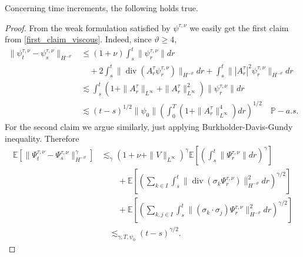 \documentclass[a4paper,10pt]{amsart}
\newcommand{\expt}[1]{\mathbb{E}\left[#1\right]}
\newtheorem{lemma}[theorem]{Lemma}
\theoremstyle{remark}
\numberwithin{equation}{section}
\begin{document}
Concerning time increments, the following holds true.
\begin{proof}
    From the weak formulation satisfied by $\psi^{\tau,\nu}$ we easily get the first claim from \eqref{first_claim_viscous}. Indeed, since $\vartheta\geq 4,$
    \begin{align*}
	        \|\psi^{\tau,\nu}_t-\psi^{\tau,\nu}_s\|_{H^{-\vartheta}}
	        &\leq (1+\nu) \int_s^t \|\psi^{\tau,\nu}_r\|dr\\
	        &\quad+2\int_s^t
	        \|\operatorname{div}(A^{\tau}_r\psi^{\tau,\nu}_r)\|_{H^{-\vartheta}}dr+\int_s^t
	        \||A^{\tau}_r|^2\psi^{\tau,\nu}_r\|_{H^{-\vartheta}}dr\\
	        &\lesssim \int_s^t
	        (1+\|A^{\tau}_r\|_{L^{\infty}}
	        +\|A^{\tau}_r\|_{L^{\infty}}^2)
	        \|\psi^{\tau,\nu}_r\|dr\\
	        &\lesssim (t-s)^{1/2}\|\psi_0\|
	        \left(\int_0^T(1+\|A^{\tau}_r\|_{L^{\infty}}^4)dr
	        \right)^{1/2}
	        \quad \mathbb{P}-a.s.
    \end{align*}
    For the second claim we argue similarly, just applying Burkholder-Davis-Gundy inequality. Therefore
    \begin{align*}
	        \expt{\|\Psi^{\tau,\nu}_t-\Psi^{\tau,\nu}_s
	        \|_{H^{-\vartheta}}^\gamma}
	        &\lesssim_{\gamma}
	        (1+\nu+\|V\|_{L^{\infty}})^\gamma
	        \expt{\left(\int_s^t \|\Psi^{\tau,\nu}_r\| dr\right)^{\gamma}}\\
	        &\qquad+\expt{\left(\sum_{k\in I}\int_s^t
	        \|\operatorname{div}(\sigma_k\Psi^{\tau,\nu}_r)
	        \|_{H^{-\vartheta}}^2dr\right)^{\gamma/2}}\\
	        &\qquad+\expt{\left(\sum_{k,j\in I}\int_s^t
	        \|(\sigma_k\cdot\sigma_j)\Psi^{\tau,\nu}_r
	        \|_{H^{-\vartheta}}^2dr\right)^{\gamma/2}}\\
	        &\quad\lesssim_{\gamma,T,\psi_0}(t-s)^{\gamma/2}.
    \end{align*}
\end{proof}
\end{document}

